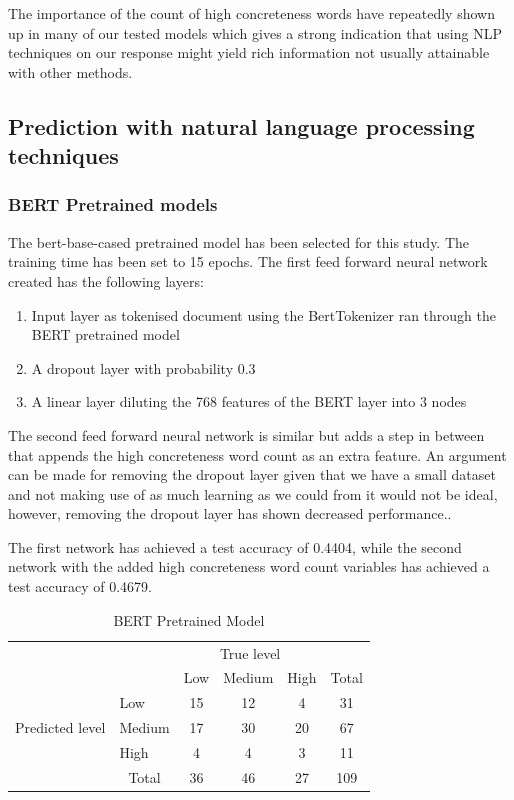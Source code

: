 \documentclass[12pt, a4paper]{article}
\begin{document}
The importance of the count of high concreteness words have repeatedly shown up in many of our tested models which gives a strong indication that using NLP techniques on our response might yield rich information not usually attainable with other methods.

\subsection{Prediction with natural language processing techniques}

\subsubsection{BERT Pretrained models}
The bert-base-cased pretrained model has been selected for this study. The training time has been set to 15 epochs. The first feed forward neural network created has the following layers: 

\begin{enumerate}
  \item Input layer as tokenised document using the BertTokenizer ran through the BERT pretrained model
  \item A dropout layer with probability 0.3
  \item A linear layer diluting the 768 features of the BERT layer into 3 nodes
\end{enumerate}

The second feed forward neural network is similar but adds a step in between that appends the high concreteness word count as an extra feature. An argument can be made for removing the dropout layer given that we have a small dataset and not making use of as much learning as we could from it would not be ideal, however, removing the dropout layer has shown decreased performance.. 

The first network has achieved a test accuracy of 0.4404, while the second network with the added high concreteness word count variables has achieved a test accuracy of 0.4679.

\begin{table}[ht]
\centering
\begin{tabular}{l|l|c|c|c|c}
\multicolumn{2}{c}{}&\multicolumn{3}{c}{True level}&\\
\cline{3-5}
\multicolumn{2}{c|}{}&Low&Medium&High&\multicolumn{1}{c}{Total}\\
\cline{2-5}
\multirow{3}{*}{Predicted level}& Low & 15 & 12 & 4 & 31\\
\cline{2-5}
& Medium & 17 & 30 & 20 & 67\\
\cline{2-5}
& High & 4 & 4 & 3 & 11\\
\cline{2-5}
\multicolumn{1}{c}{} & \multicolumn{1}{c}{Total} & \multicolumn{1}{c}{36} & \multicolumn{    1}{c}{46} & \multicolumn{    1}{c}{27} & \multicolumn{1}{c}{109}\\
\end{tabular}
\caption{BERT Pretrained Model}
\label{table:pretrained}
\end{table}
\end{document}
